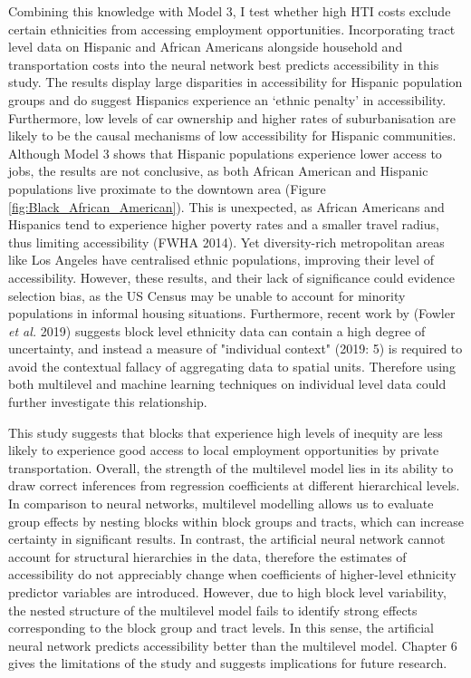 \documentclass[a4paper,UKenglish]{lipics-v2018}
\begin{document}
Combining this knowledge with Model 3, I test whether high HTI costs exclude certain ethnicities from accessing employment opportunities. Incorporating tract level data on Hispanic and African Americans alongside household and transportation costs into the neural network best predicts accessibility in this study. The results display large disparities in accessibility for Hispanic population groups and do suggest Hispanics experience an ‘ethnic penalty’ in accessibility. Furthermore, low levels of car ownership and higher rates of suburbanisation are likely to be the causal mechanisms of low accessibility for Hispanic communities. Although Model 3 shows that Hispanic populations experience lower access to jobs, the results are not conclusive, as both African American and Hispanic populations live proximate to the downtown area (Figure \ref{fig:Black_African_American}). This is unexpected, as African Americans and Hispanics tend to experience higher poverty rates and a smaller travel radius, thus limiting accessibility (FWHA 2014). Yet diversity-rich metropolitan areas like Los Angeles have centralised ethnic populations, improving their level of accessibility. However, these results, and their lack of significance could evidence selection bias, as the US Census may be unable to account for minority populations in informal housing situations. Furthermore, recent work by (Fowler \textit{et al.} 2019) suggests block level ethnicity data can contain a high degree of uncertainty, and instead a measure of "individual context" (2019: 5) is required to avoid the contextual fallacy of aggregating data to spatial units. Therefore using both multilevel and machine learning techniques on individual level data could further investigate this relationship.

This study suggests that blocks that experience high levels of inequity are less likely to experience good access to local employment opportunities by private transportation. Overall, the strength of the multilevel model lies in its ability to draw correct inferences from regression coefficients at different hierarchical levels. In comparison to neural networks, multilevel modelling allows us to evaluate group effects by nesting blocks within block groups and tracts, which can increase certainty in significant results. In contrast, the artificial neural network cannot account for structural hierarchies in the data, therefore the estimates of accessibility do not appreciably change when coefficients of higher-level ethnicity predictor variables are introduced. However, due to high block level variability, the nested structure of the multilevel model fails to identify strong effects corresponding to the block group and tract levels. In this sense, the artificial neural network predicts accessibility better than the multilevel model. Chapter 6 gives the limitations of the study and suggests implications for future research.
\end{document}
